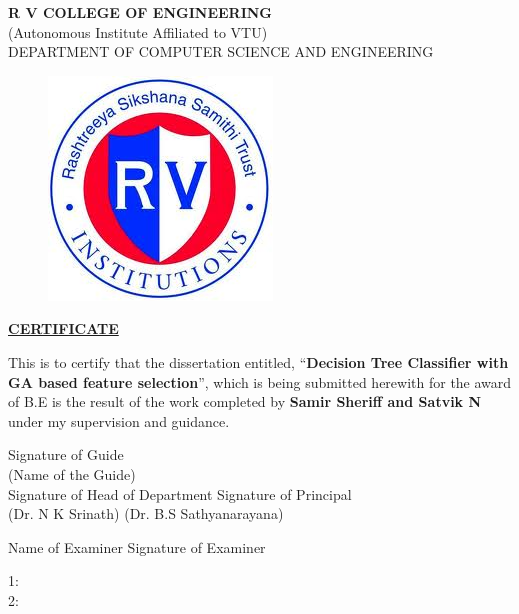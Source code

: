 \documentclass[12pt]{report}
\begin{document}
\begin{titlepage}
\newpage
\begin{center}
{\bfseries\large R V COLLEGE OF ENGINEERING}\\
{\normalsize (Autonomous Institute Affiliated to VTU)}\\
{\normalsize DEPARTMENT OF COMPUTER SCIENCE AND ENGINEERING}\\
\end{center}
	
\begin{figure}[h!]
	\centering
		\includegraphics[scale=0.5]{RVCE.png}
\end{figure}

\begin{center}
\bf{\underline{CERTIFICATE}}
\end{center}
\noindent This is to certify that the dissertation entitled, ``\textbf{Decision Tree Classifier with GA based feature selection}'',  which is being submitted herewith for the award of B.E is the result of the work completed by \textbf{Samir Sheriff and Satvik N}  under my supervision and guidance.
\vspace{.5in}

\begin{flushleft} Signature of Guide 	
\\ (Name of the Guide) \\
\vspace{.5in}
 Signature of Head of Department  \hspace{4cm} Signature of Principal \\
 (Dr. N K Srinath) \hspace{6.6cm} (Dr. B.S Sathyanarayana)\\
 
 \end{flushleft} 
\begin{flushleft}
\hspace{1in}Name of Examiner \hspace{1.25in} Signature of Examiner
\end{flushleft}
\begin{flushleft}
1: \\
\vspace{.5in} 
2: 
\end{flushleft}
\end{titlepage}
\end{document}

